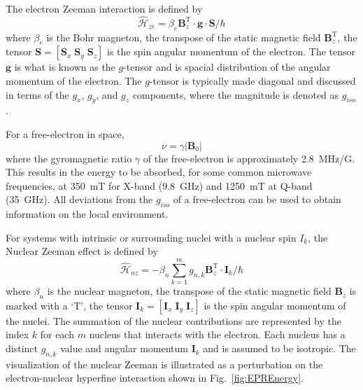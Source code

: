 The electron Zeeman interaction is defined by
\begin{equation*}
    \hat{\mathcal{H}}_{ze} = \beta_e \mathbf{B}^\text{T}_z  \cdot \mathbf{g} \cdot \mathbf{S}/\hbar
\end{equation*}
where $\beta_e$ is the Bohr magneton, the transpose of the static magnetic field $\mathbf{B}_z^{\text{T}}$, the tensor $\mathbf{S} = [\mathbf{S}_x \; \mathbf{S}_y \; \mathbf{S}_z]$ is the spin angular momentum of the electron. The tensor $\mathbf{g}$ is what is known as the $g$-tensor and is spacial distribution of the angular momentum of the electron. The $g$-tensor is typically made diagonal and discussed in terms of the $g_x$, $g_y$, and $g_z$ components, where the magnitude is denoted as $g_{iso}$. 

For a free-electron in space, 
\begin{equation}
    \nu = \gamma |\mathbf{B}_0|
\end{equation}
where the gyromagnetic ratio $\gamma$ of the free-electron is approximately 2.8~MHz/G. This results in the energy to be absorbed, for some common microwave frequencies, at 350~mT for X-band (9.8~GHz) and 1250~mT at Q-band (35~GHz). All deviations from the $g_{iso}$ of a free-electron can be used to obtain information on the local environment. 

For systems with intrinsic or surrounding nuclei with a nuclear spin $I_k$, the Nuclear Zeeman effect is defined by
\begin{equation*}
    \hat{\mathcal{H}}_{nz} = - \beta_n \sum_{k=1}^m g_{n,k} \mathbf{B}^\text{T}_z  \cdot \mathbf{I}_k/\hbar
\end{equation*}
where $\beta_n$ is the nuclear magneton, the transpose of the static magnetic field $\mathbf{B}_z$ is marked with a `T', the tensor $\mathbf{I}_k = [\mathbf{I}_x \; \mathbf{I}_y \; \mathbf{I}_z]$ is the spin angular momentum of the nuclei. The summation of the nuclear contributions are represented by the index $k$ for each $m$ nucleus that interacts with the electron. Each nucleus has a distinct $g_{n,k}$ value and angular momentum $\mathbf{I}_k$ and is assumed to be isotropic. The visualization of the nuclear Zeeman is illustrated as a perturbation on the electron-nuclear hyperfine interaction shown in Fig.~\ref{fig:EPREnergy}.


